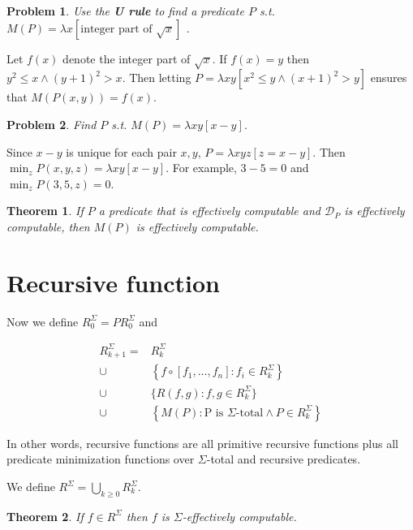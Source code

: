 \documentclass[a4paper, 12pt]{article}
\newtheorem{problem}{Problem}
\newtheorem{theorem}{Theorem}
\newtheorem{problem}{Problem}
\newtheorem{theorem}{Theorem}
\begin{document}
\begin{problem}
    Use the \textbf{U rule} to find a predicate $P$ s.t. $M(P) = \lambda
    x[\text{integer part of } \sqrt{x}]$ .
\end{problem}

Let $f(x)$ denote the integer part of $\sqrt{x}$. If $f(x) = y$ then $y^2 \leq x
\land (y+1)^2 > x$. Then letting $P = \lambda xy\left[ x^2 \leq y \land (x +
1)^2 > y \right] $ ensures that $M(P(x, y)) = f(x)$.

\begin{problem}
    Find $P$ s.t. $M(P) = \lambda xy\left[ x - y \right] $.
\end{problem}

Since $x - y$ is unique for each pair $x, y$, $P = \lambda xyz [z = x - y]$. Then
$\min_z P(x, y, z) = \lambda xy[x - y]$. For example, $3 - 5 = 0$ and $\min_z
P(3, 5, z) = 0$.

\begin{theorem}
    If $P$ a predicate that is effectively computable and $\mathcal{D}_P$ is
    effectively computable, then $M(P)$ is effectively computable.
\end{theorem}

\section{Recursive function}

Now we define $R_0^{\Sigma} = PR_0^{\Sigma}$ and 

\begin{align*}
    R_{k+1}^{\Sigma} = &R_k^{\Sigma} \\ \cup &\left\{ f \circ \left[ f_1, \ldots,
    f_n \right] : f_i \in R_{k}^{\Sigma} \right\} \\ \cup &\{R(f, g) : f, g \in
R_k^{\Sigma}\} \\ \cup & \left\{M(P) : \text{P is $\Sigma$-total} \land P \in
R_k^{\Sigma}\right\}
\end{align*}

In other words, recursive functions are all primitive recursive functions plus
all predicate minimization functions over $\Sigma$-total and recursive
predicates.

We define $R^{\Sigma} = \bigcup_{k\geq 0} R_{k}^{\Sigma}$.

\begin{theorem}
    If $f \in R^{\Sigma}$ then $f$ is $\Sigma$-effectively computable.
\end{theorem}
\end{document}
